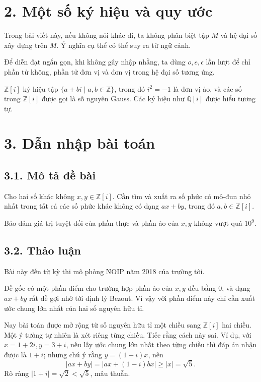 \documentclass[11pt]{article}
\begin{document}
\section*{2. Một số ký hiệu và quy ước}

Trong bài viết này, nếu không nói khác đi, ta không phân biệt tập \(M\) và hệ
đại số xây dựng trên \(M\). Ý nghĩa cụ thể có thể suy ra từ ngữ cảnh.

Để diễn đạt ngắn gọn, khi không gây nhập nhằng, ta dùng \(o,e,\epsilon\) lần
lượt để chỉ phần tử không, phần tử đơn vị và đơn vị trong hệ đại số tương ứng.

\(\mathbb Z[i]\) ký hiệu tập \(\{a+bi\mid a,b\in\mathbb Z\}\), trong đó
\(i^2=-1\) là đơn vị ảo, và các số trong \(\mathbb Z[i]\) được gọi là số
nguyên Gauss. Các ký hiệu như \(\mathbb Q[i]\) được hiểu tương tự.

\section*{3. Dẫn nhập bài toán}

\subsection*{3.1. Mô tả đề bài}

Cho hai số khác không \(x,y\in\mathbb Z[i]\). Cần tìm và xuất ra số phức có
mô-đun nhỏ nhất trong tất cả các số phức khác không có dạng \(ax+by\), trong
đó \(a,b\in\mathbb Z[i]\).

Bảo đảm giá trị tuyệt đối của phần thực và phần ảo của \(x,y\) không vượt quá
\(10^9\).

\subsection*{3.2. Thảo luận}

Bài này đến từ kỳ thi mô phỏng NOIP năm 2018 của trường tôi.

Đề gốc có một phần điểm cho trường hợp phần ảo của \(x,y\) đều bằng \(0\), và
dạng \(ax+by\) rất dễ gợi nhớ tới định lý Bezout. Vì vậy với phần điểm này
chỉ cần xuất ước chung lớn nhất của hai số nguyên hữu tỉ.

Nay bài toán được mở rộng từ số nguyên hữu tỉ một chiều sang
\(\mathbb Z[i]\) hai chiều. Một ý tưởng tự nhiên là xét riêng từng chiều.
Tiếc rằng cách này sai. Ví dụ, với \(x=1+2i,y=3+i\), nếu lấy ước chung lớn
nhất theo từng chiều thì đáp án nhận được là \(1+i\); nhưng chú ý rằng
\(y=(1-i)x\), nên
\[
  |ax+by|=|ax+(1-i)bx|\ge |x|=\sqrt5.
\]
Rõ ràng \(|1+i|=\sqrt2<\sqrt5\), mâu thuẫn.
\end{document}
